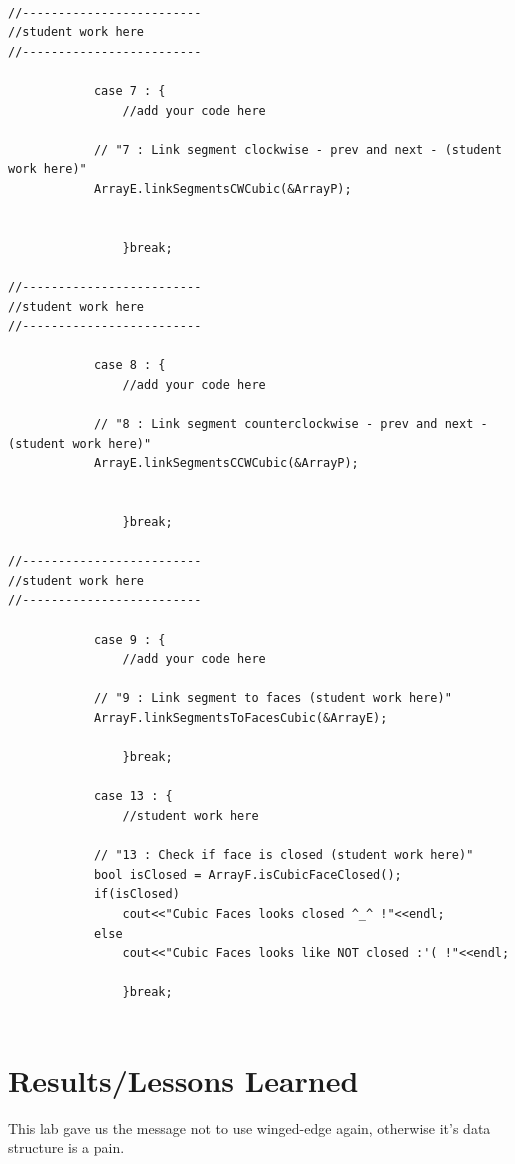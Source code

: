 \documentclass{article}
\begin{document}
\begin{lstlisting}[label=main-cpp,caption=main.cpp]	

//-------------------------
//student work here
//-------------------------

            case 7 : {
                //add your code here

            // "7 : Link segment clockwise - prev and next - (student work here)"
            ArrayE.linkSegmentsCWCubic(&ArrayP);


                }break;

//-------------------------
//student work here
//-------------------------

            case 8 : {
                //add your code here

            // "8 : Link segment counterclockwise - prev and next - (student work here)"
            ArrayE.linkSegmentsCCWCubic(&ArrayP);


                }break;

//-------------------------
//student work here
//-------------------------

            case 9 : {
                //add your code here

            // "9 : Link segment to faces (student work here)"
            ArrayF.linkSegmentsToFacesCubic(&ArrayE);

                }break;
                
            case 13 : {
                //student work here

            // "13 : Check if face is closed (student work here)"
            bool isClosed = ArrayF.isCubicFaceClosed();
            if(isClosed)
                cout<<"Cubic Faces looks closed ^_^ !"<<endl;
            else
                cout<<"Cubic Faces looks like NOT closed :'( !"<<endl;

                }break;


\end{lstlisting}



\section{Results/Lessons Learned}

This lab gave us the message not to use winged-edge again, otherwise it's data structure is a pain.
\end{document}
